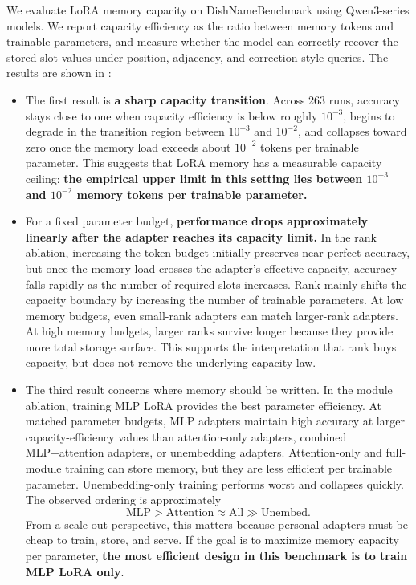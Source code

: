 \documentclass{llmxive}
\begin{document}
We evaluate LoRA memory capacity on DishNameBenchmark using Qwen3-series models. We report capacity efficiency as the ratio between memory tokens and trainable parameters, and measure whether the model can correctly recover the stored slot values under position, adjacency, and correction-style queries. The results are shown in : 

\begin{itemize}
    \item The first result is \textbf{a sharp capacity transition}. Across 263 runs, accuracy stays close to one when capacity efficiency is below roughly \(10^{-3}\), begins to degrade in the transition region between \(10^{-3}\) and \(10^{-2}\), and collapses toward zero once the memory load exceeds about \(10^{-2}\) tokens per trainable parameter. This suggests that LoRA memory has a measurable capacity ceiling: \textbf{the empirical upper limit in this setting lies between \(10^{-3}\) and \(10^{-2}\) memory tokens per trainable parameter.}
    \item For a fixed parameter budget, \textbf{performance drops approximately linearly after the adapter reaches its capacity limit.} In the rank ablation, increasing the token budget initially preserves near-perfect accuracy, but once the memory load crosses the adapter's effective capacity, accuracy falls rapidly as the number of required slots increases. Rank mainly shifts the capacity boundary by increasing the number of trainable parameters. At low memory budgets, even small-rank adapters can match larger-rank adapters. At high memory budgets, larger ranks survive longer because they provide more total storage surface. This supports the interpretation that rank buys capacity, but does not remove the underlying capacity law.
    \item The third result concerns where memory should be written. In the module ablation, training MLP LoRA provides the best parameter efficiency. At matched parameter budgets, MLP adapters maintain high accuracy at larger capacity-efficiency values than attention-only adapters, combined MLP+attention adapters, or unembedding adapters. Attention-only and full-module training can store memory, but they are less efficient per trainable parameter. Unembedding-only training performs worst and collapses quickly. The observed ordering is approximately
    \[
    \mathrm{MLP} > \mathrm{Attention} \approx \mathrm{All} \gg \mathrm{Unembed}.
    \]
    From a scale-out perspective, this matters because personal adapters must be cheap to train, store, and serve. If the goal is to maximize memory capacity per parameter, \textbf{the most efficient design in this benchmark is to train MLP LoRA only}.
\end{itemize}
\end{document}
